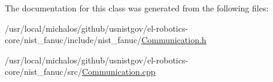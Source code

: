 The documentation for this class was generated from the following files\-:\begin{DoxyCompactItemize}
\item 
/usr/local/michalos/github/usnistgov/el-\/robotics-\/core/nist\-\_\-fanuc/include/nist\-\_\-fanuc/\hyperlink{Communication_8h}{Communication.\-h}\item 
/usr/local/michalos/github/usnistgov/el-\/robotics-\/core/nist\-\_\-fanuc/src/\hyperlink{Communication_8cpp}{Communication.\-cpp}\end{DoxyCompactItemize}
